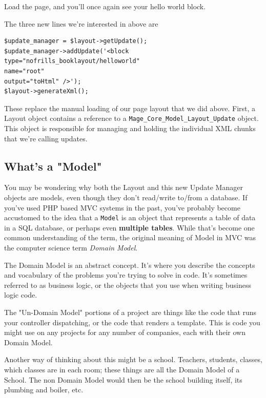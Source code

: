 \documentclass[oneside]{book}
\begin{document}
Load the page, and you'll once again see your hello world block.

The three new lines we're interested in above are

\begin{lstlisting}
$update_manager = $layout->getUpdate();
$update_manager->addUpdate('<block
type="nofrills_booklayout/helloworld"
name="root"
output="toHtml" />');
$layout->generateXml();

\end{lstlisting}


These replace the manual loading of our page layout that we did above.  First, a Layout object contains a reference to a \footnotesize\texttt{Mage\_Core\_Model\_Layout\_Update} \normalsize  object.  This object is responsible for managing and holding the individual XML chunks that we're calling updates.

\subsection{What's a "Model"}

You may be wondering why both the Layout and this new Update Manager objects are models, even though they don't read/write to/from a database.  If you've used PHP based MVC systems in the past, you've probably become accustomed to the idea that a \footnotesize\texttt{Model} \normalsize  is an object that represents a table of data in a SQL database, or perhaps even \textbf{multiple tables}.  While that's become one common understanding of the term, the original meaning of Model in MVC was the computer science term \emph{Domain Model}.

The Domain Model is an abstract concept.  It's where you describe the concepts and vocabulary of the problems you're trying to solve in code.  It's sometimes referred to as business logic, or the objects that you use when writing business logic code.

The "Un-Domain Model" portions of a project are things like the code that runs your controller dispatching, or the code that renders a template.  This is code you might use on any projects for any number of companies, each with their own Domain Model.

Another way of thinking about this might be a school.  Teachers, students, classes, which classes are in each room; these things are all the Domain Model of a School.  The non Domain Model would then be the school building itself, its plumbing and boiler, etc.
\end{document}
